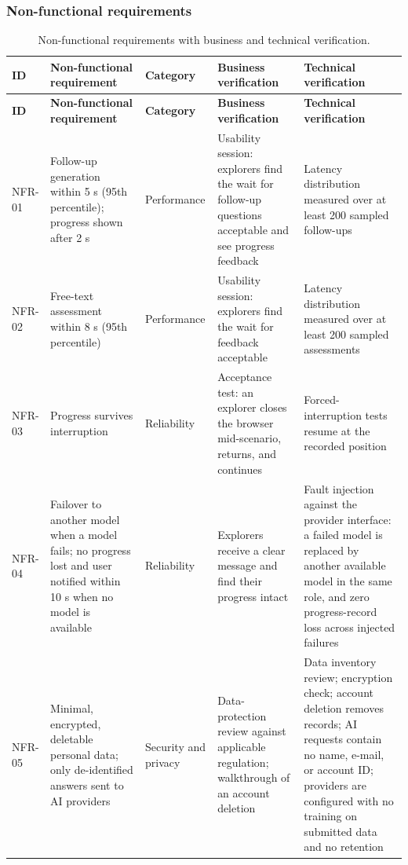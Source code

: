 \subsubsection{Non-functional requirements}

{\small
\begin{longtable}{|>{\raggedright\arraybackslash}p{}|>{\raggedright\arraybackslash}p{}|>{\raggedright\arraybackslash}p{}|>{\raggedright\arraybackslash}p{}|>{\raggedright\arraybackslash}p{}|}
\caption{Non-functional requirements with business and technical verification.} \\
\hline
\textbf{ID} & \textbf{Non-functional requirement} & \textbf{Category} & \textbf{Business verification} & \textbf{Technical verification} \\ \hline
\endfirsthead
\hline
\textbf{ID} & \textbf{Non-functional requirement} & \textbf{Category} & \textbf{Business verification} & \textbf{Technical verification} \\ \hline
\endhead
NFR-01 & Follow-up generation within 5 s (95th percentile); progress shown after 2 s & Performance & Usability session: explorers find the wait for follow-up questions acceptable and see progress feedback & Latency distribution measured over at least 200 sampled follow-ups \\ \hline
NFR-02 & Free-text assessment within 8 s (95th percentile) & Performance & Usability session: explorers find the wait for feedback acceptable & Latency distribution measured over at least 200 sampled assessments \\ \hline
NFR-03 & Progress survives interruption & Reliability & Acceptance test: an explorer closes the browser mid-scenario, returns, and continues & Forced-interruption tests resume at the recorded position \\ \hline
NFR-04 & Failover to another model when a model fails; no progress lost and user notified within 10 s when no model is available & Reliability & Explorers receive a clear message and find their progress intact & Fault injection against the provider interface: a failed model is replaced by another available model in the same role, and zero progress-record loss across injected failures \\ \hline
NFR-05 & Minimal, encrypted, deletable personal data; only de-identified answers sent to AI providers & Security and privacy & Data-protection review against applicable regulation; walkthrough of an account deletion & Data inventory review; encryption check; account deletion removes records; AI requests contain no name, e-mail, or account ID; providers are configured with no training on submitted data and no retention \\ \hline

\end{longtable}}
